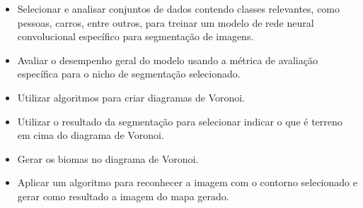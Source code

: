 \begin{itemize}
	\item Selecionar e analisar conjuntos de dados contendo classes relevantes, como pessoas, carros, entre outros, para treinar um modelo de rede neural convolucional específico para segmentação de imagens.
	\item Avaliar o desempenho geral do modelo usando a métrica de avaliação específica para o nicho de segmentação selecionado.
	\item Utilizar algoritmos para criar diagramas de Voronoi.
	\item Utilizar o resultado da segmentação para selecionar indicar o que é terreno em cima do diagrama de Voronoi.
	\item Gerar os biomas no diagrama de Voronoi.
	\item Aplicar um algoritmo para reconhecer a imagem com o contorno selecionado e gerar como resultado a imagem do mapa gerado.
\end{itemize}

